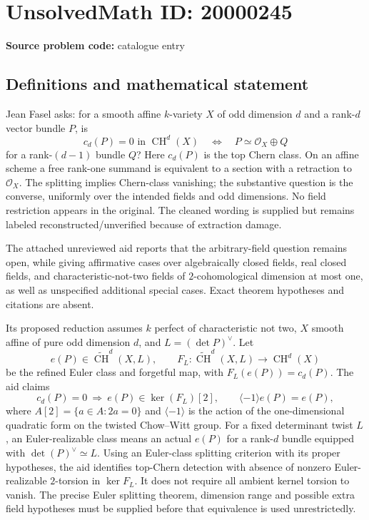 \documentclass[11pt]{article}
\begin{document}
\section*{UnsolvedMath ID: 20000245}
\textbf{Source problem code:} catalogue entry
\subsection{Definitions and mathematical statement}
Jean Fasel asks: for a smooth affine $k$-variety $X$ of odd dimension $d$ and a rank-$d$ vector bundle $P$, is
\[
c_d(P)=0\text{ in }\operatorname{CH}^d(X)
\quad\Longleftrightarrow\quad
P\simeq\mathcal O_X\oplus Q
\]
for a rank-$(d-1)$ bundle $Q$? Here $c_d(P)$ is the top Chern class. On an affine scheme a free rank-one summand is equivalent to a section with a retraction to $\mathcal O_X$. The splitting implies Chern-class vanishing; the substantive question is the converse, uniformly over the intended fields and odd dimensions. No field restriction appears in the original. The cleaned wording is supplied but remains labeled reconstructed/unverified because of extraction damage.

The attached unreviewed aid reports that the arbitrary-field question remains open, while giving affirmative cases over algebraically closed fields, real closed fields, and characteristic-not-two fields of $2$-cohomological dimension at most one, as well as unspecified additional special cases. Exact theorem hypotheses and citations are absent.

Its proposed reduction assumes $k$ perfect of characteristic not two, $X$ smooth affine of pure odd dimension $d$, and $L=(\det P)^\vee$. Let
\[
e(P)\in\widetilde{\operatorname{CH}}^d(X,L),\qquad
F_L:\widetilde{\operatorname{CH}}^d(X,L)\to\operatorname{CH}^d(X)
\]
be the refined Euler class and forgetful map, with $F_L(e(P))=c_d(P)$. The aid claims
\[
c_d(P)=0\ \Longrightarrow\
e(P)\in\ker(F_L)[2],\qquad\langle-1\rangle e(P)=e(P),
\]
where $A[2]=\{a\in A:2a=0\}$ and $\langle-1\rangle$ is the action of the one-dimensional quadratic form on the twisted Chow--Witt group. For a fixed determinant twist $L$, an Euler-realizable class means an actual $e(P)$ for a rank-$d$ bundle equipped with $\det(P)^\vee\simeq L$. Using an Euler-class splitting criterion with its proper hypotheses, the aid identifies top-Chern detection with absence of nonzero Euler-realizable $2$-torsion in $\ker F_L$. It does not require all ambient kernel torsion to vanish. The precise Euler splitting theorem, dimension range and possible extra field hypotheses must be supplied before that equivalence is used unrestrictedly.
\end{document}
